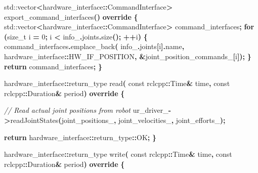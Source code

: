 \documentclass[
]{article}
\newenvironment{Shaded}{\begin{snugshade}}{\end{snugshade}}
\newcommand{\AttributeTok}[1]{\textcolor[rgb]{0.13,0.29,0.53}{#1}}
\newcommand{\BuiltInTok}[1]{#1}
\newcommand{\CommentTok}[1]{\textcolor[rgb]{0.56,0.35,0.01}{\textit{#1}}}
\newcommand{\ControlFlowTok}[1]{\textcolor[rgb]{0.13,0.29,0.53}{\textbf{#1}}}
\newcommand{\DataTypeTok}[1]{\textcolor[rgb]{0.13,0.29,0.53}{#1}}
\newcommand{\DecValTok}[1]{\textcolor[rgb]{0.00,0.00,0.81}{#1}}
\newcommand{\KeywordTok}[1]{\textcolor[rgb]{0.13,0.29,0.53}{\textbf{#1}}}
\newcommand{\NormalTok}[1]{#1}
\newcommand{\OperatorTok}[1]{\textcolor[rgb]{0.81,0.36,0.00}{\textbf{#1}}}
\newcommand{\VariableTok}[1]{\textcolor[rgb]{0.00,0.00,0.00}{#1}}
\begin{document}
\begin{Shaded}
\begin{Highlighting}[]
    \BuiltInTok{std::}\NormalTok{vector}\OperatorTok{\textless{}}\NormalTok{hardware\_interface}\OperatorTok{::}\NormalTok{CommandInterface}\OperatorTok{\textgreater{}}\NormalTok{ export\_command\_interfaces}\OperatorTok{()} \KeywordTok{override} \OperatorTok{\{}
        \BuiltInTok{std::}\NormalTok{vector}\OperatorTok{\textless{}}\NormalTok{hardware\_interface}\OperatorTok{::}\NormalTok{CommandInterface}\OperatorTok{\textgreater{}}\NormalTok{ command\_interfaces}\OperatorTok{;}
        \ControlFlowTok{for} \OperatorTok{(}\DataTypeTok{size\_t}\NormalTok{ i }\OperatorTok{=} \DecValTok{0}\OperatorTok{;}\NormalTok{ i }\OperatorTok{\textless{}} \VariableTok{info\_}\OperatorTok{.}\NormalTok{joints}\OperatorTok{.}\NormalTok{size}\OperatorTok{();} \OperatorTok{++}\NormalTok{i}\OperatorTok{)} \OperatorTok{\{}
\NormalTok{            command\_interfaces}\OperatorTok{.}\NormalTok{emplace\_back}\OperatorTok{(}
                \VariableTok{info\_}\OperatorTok{.}\NormalTok{joints}\OperatorTok{[}\NormalTok{i}\OperatorTok{].}\NormalTok{name}\OperatorTok{,}\NormalTok{ hardware\_interface}\OperatorTok{::}\NormalTok{HW\_IF\_POSITION}\OperatorTok{,}
                \OperatorTok{\&}\VariableTok{joint\_position\_commands\_}\OperatorTok{[}\NormalTok{i}\OperatorTok{]);}
        \OperatorTok{\}}
        \ControlFlowTok{return}\NormalTok{ command\_interfaces}\OperatorTok{;}
    \OperatorTok{\}}

\NormalTok{    hardware\_interface}\OperatorTok{::}\DataTypeTok{return\_type}\NormalTok{ read}\OperatorTok{(}
        \AttributeTok{const}\NormalTok{ rclcpp}\OperatorTok{::}\NormalTok{Time}\OperatorTok{\&}\NormalTok{ time}\OperatorTok{,} \AttributeTok{const}\NormalTok{ rclcpp}\OperatorTok{::}\NormalTok{Duration}\OperatorTok{\&}\NormalTok{ period}\OperatorTok{)} \KeywordTok{override} \OperatorTok{\{}

        \CommentTok{// Read actual joint positions from robot}
        \VariableTok{ur\_driver\_}\OperatorTok{{-}\textgreater{}}\NormalTok{readJointStates}\OperatorTok{(}\VariableTok{joint\_positions\_}\OperatorTok{,} \VariableTok{joint\_velocities\_}\OperatorTok{,} \VariableTok{joint\_efforts\_}\OperatorTok{);}

        \ControlFlowTok{return}\NormalTok{ hardware\_interface}\OperatorTok{::}\DataTypeTok{return\_type}\OperatorTok{::}\NormalTok{OK}\OperatorTok{;}
    \OperatorTok{\}}

\NormalTok{    hardware\_interface}\OperatorTok{::}\DataTypeTok{return\_type}\NormalTok{ write}\OperatorTok{(}
        \AttributeTok{const}\NormalTok{ rclcpp}\OperatorTok{::}\NormalTok{Time}\OperatorTok{\&}\NormalTok{ time}\OperatorTok{,} \AttributeTok{const}\NormalTok{ rclcpp}\OperatorTok{::}\NormalTok{Duration}\OperatorTok{\&}\NormalTok{ period}\OperatorTok{)} \KeywordTok{override} \OperatorTok{\{}


\end{Highlighting}
\end{Shaded}
\end{document}
